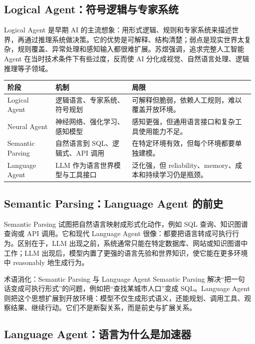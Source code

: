 \documentclass[a4paper]{article}
\begin{document}
\subsection{Logical Agent：符号逻辑与专家系统}

Logical Agent 是早期 AI 的主流想象：用形式逻辑、规则和专家系统来描述世界，再通过推理系统做决策。它的优势是可解释、结构清楚；弱点是现实世界太复杂，规则覆盖、异常处理和感知输入都很难扩展。苏煜强调，追求完整人工智能 Agent 在当时技术条件下有些过度，反而使 AI 分化成视觉、自然语言处理、逻辑推理等子领域。

\noindent\begin{tabularx}{\textwidth}{p{}p{}X}
\toprule
阶段 & 机制 & 局限 \\
\midrule
Logical Agent & 逻辑语言、专家系统、符号规划 & 可解释但脆弱，依赖人工规则，难以覆盖开放环境。 \\
Neural Agent & 神经网络、强化学习、感知模型 & 感知更强，但通用语言接口和复杂工具使用能力不足。 \\
Semantic Parsing & 自然语言到 SQL、逻辑式、API 调用 & 在特定环境有效，但每个环境都要单独建模。 \\
Language Agent & LLM 作为语言世界模型与工具接口 & 泛化强，但 reliability、memory、成本和持续学习仍是瓶颈。 \\
\bottomrule
\end{tabularx}

\subsection{Semantic Parsing：Language Agent 的前史}

Semantic Parsing 试图把自然语言映射成形式化动作，例如 SQL 查询、知识图谱查询或 API 调用。它和现代 Language Agent 很像：都要把语言转成可执行行为。区别在于，LLM 出现之前，系统通常只能在特定数据库、网站或知识图谱中工作；LLM 出现后，模型内置了更强的语言先验和世界知识，使它能在更多环境中 reasonably 地生成行为。

\begin{knowledgebox}{术语消化：Semantic Parsing 与 Language Agent}
Semantic Parsing 解决“把一句话变成可执行形式”的问题，例如把“查找某城市人口”变成 SQL。Language Agent 则把这个思想扩展到开放环境：模型不仅生成形式语义，还能规划、调用工具、观察结果、继续行动。它们不是断裂关系，而是前史与扩展关系。
\end{knowledgebox}

\subsection{Language Agent：语言为什么是加速器}
\end{document}
